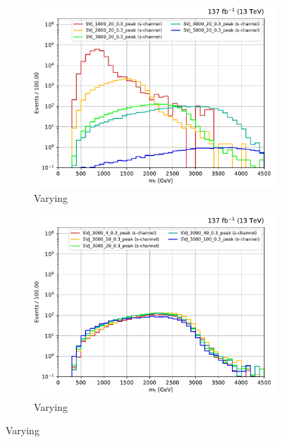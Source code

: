 \begin{figure}[htbp]
    \centering
    \begin{subfigure}[b]{0.49\textwidth}
        \includegraphics[width=\textwidth]{figures/s_channel_benchmark_variations/mZp.pdf}
        \caption{Varying \mZprime}
    \end{subfigure}
    \hfill
    \begin{subfigure}[b]{0.49\textwidth}
        \includegraphics[width=\textwidth]{figures/s_channel_benchmark_variations/mD.pdf}
        \caption{Varying \mDark}
    \end{subfigure}


\end{figure}
